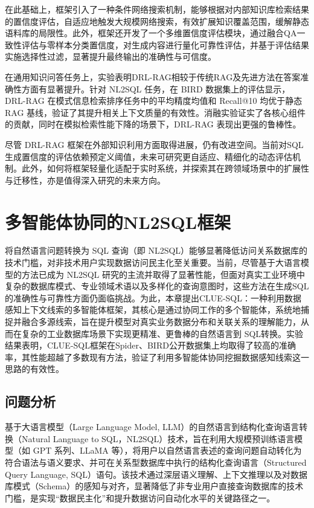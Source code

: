 \documentclass[12pt,a4paper,openright,UTF8]{ctexbook}
\begin{document}
在此基础上，框架引入了一种条件网络搜索机制，能够根据对内部知识库检索结果的置信度评估，自适应地触发大规模网络搜索，有效扩展知识覆盖范围，缓解静态语料库的局限性。此外，框架还开发了一个多维置信度评估模块，通过融合QA一致性评估与零样本分类置信度，对生成内容进行量化可靠性评估，并基于评估结果实施选择性过滤，显著提升最终输出的准确性与可信度。


在通用知识问答任务上，实验表明DRL-RAG相较于传统RAG及先进方法在答案准确性方面有显著提升。针对 NL2SQL 任务，在 BIRD 数据集上的评估显示，DRL-RAG 在模式信息检索排序任务中的平均精度均值和 Recall@10 均优于静态RAG 基线，验证了其提升相关上下文质量的有效性。消融实验证实了各核心组件的贡献，同时在模拟检索性能下降的场景下，DRL-RAG 表现出更强的鲁棒性。


尽管 DRL-RAG 框架在外部知识利用方面取得进展，仍有改进空间。当前对SQL 生成置信度的评估依赖预定义阈值，未来可研究更自适应、精细化的动态评估机制。此外，如何将框架轻量化适配于实时系统，并探索其在跨领域场景中的扩展性与迁移性，亦是值得深入研究的未来方向。

\chapter{多智能体协同的NL2SQL框架}

将自然语言问题转换为 SQL 查询（即 NL2SQL）能够显著降低访问关系数据库的技术门槛，对非技术用户实现数据访问民主化至关重要。当前，尽管基于大语言模型的方法已成为 NL2SQL 研究的主流并取得了显著性能，但面对真实工业环境中复杂的数据库模式、专业领域术语以及多样化的查询意图时，这些方法在生成SQL的准确性与可靠性方面仍面临挑战。为此，本章提出CLUE-SQL：一种利用数据感知上下文线索的多智能体框架，其核心是通过协同工作的多个智能体，系统地捕捉并融合多源线索，旨在提升模型对真实业务数据分布和关联关系的理解能力，从而在复杂的工业数据库场景下实现更精准、更鲁棒的自然语言到 SQL转换。实验结果表明，CLUE-SQL框架在Spider、BIRD公开数据集上均取得了较高的准确率，其性能超越了多数现有方法，验证了利用多智能体协同挖掘数据感知线索这一思路的有效性。

\section{问题分析}

基于大语言模型（Large Language Model, LLM）的自然语言到结构化查询语言转换（Natural Language to SQL，NL2SQL）技术，旨在利用大规模预训练语言模型（如 GPT 系列、LLaMA 等），将用户以自然语言表述的查询问题自动转化为符合语法与语义要求、并可在关系型数据库中执行的结构化查询语言（Structured Query Language, SQL）语句。该技术通过深层语义理解、上下文推理以及对数据库模式（Schema）的感知与对齐，显著降低了非专业用户直接查询数据库的技术门槛，是实现“数据民主化”和提升数据访问自动化水平的关键路径之一。
\end{document}
